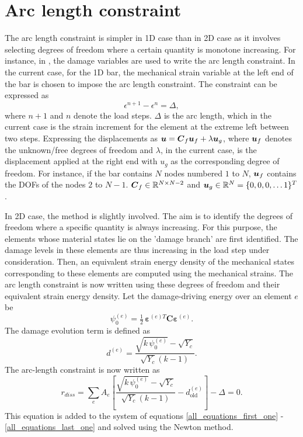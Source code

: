 \documentclass[10pt]{cas-sc}
\begin{document}
\section{Arc length constraint\label{appen_arc_length}}
The arc length constraint is simpler in 1D case than in 2D case as it involves selecting degrees of freedom where a certain quantity is monotone increasing. For instance, in \cite{Bharali2022,Singh2016}, the damage variables are used to write the arc length constraint. In the current case, for the 1D bar, the mechanical strain variable at the left end of the bar is chosen to impose the arc length constraint. The constraint can be expressed as
\begin{equation}
	\epsilon^{n+1} - \epsilon^{n} = \Delta, \label{onedarclength}
\end{equation}
where $n+1$ and $n$ denote the load steps. $\Delta$ is the arc length, which in the current case is the strain increment for the element at the extreme left between two steps. Expressing the displacements as $\mbox{\boldmath $u$} = \mbox{\boldmath $C$}_f \mbox{\boldmath $u$}_f + \lambda \mbox{\boldmath $u$}_g$, where $\mbox{\boldmath $u$}_f$ denotes the unknown/free degrees of freedom and $\lambda$, in the current case, is the displacement applied at the right end with $u_g$ as the corresponding degree of freedom. For instance, if the bar contains $N$ nodes numbered $1$ to $N$, $\mbox{\boldmath $u$}_f$ contains the DOFs of the nodes $2$ to $N-1$. $\mbox{\boldmath $C$}_f \in \mathbb{R}^{N \times N-2}$ and $\mbox{\boldmath $u$}_g \in \mathbb{R}^N = \{0,0,0,\dots 1\}^T$.

In 2D case, the method is slightly involved. The aim is to identify the degrees of freedom where a specific quantity is always increasing. For this purpose, the elements whose material states lie on the 'damage branch' are first identified. The damage levels in these elements are thus increasing in the load step under consideration. Then, an equivalent strain energy density of the mechanical states corresponding to these elements are computed using the mechanical strains. The arc length constraint is now written using these degrees of freedom and their equivalent strain energy density. 
Let the damage-driving energy over an element $e$ be
\begin{equation}
	\psi_0^{(e)} = \tfrac{1}{2}\,\boldsymbol{\varepsilon}^{(e)T}\mathbf{C}\boldsymbol{\varepsilon}^{(e)}. \label{undamaged_energy_func}
\end{equation}
The damage evolution term is defined as
\begin{equation}
	d^{(e)} = \frac{\sqrt{k\,\psi_0^{(e)}} - \sqrt{Y_c}}{\sqrt{Y_c}(k-1)}.
\end{equation}
The arc-length constraint is now written as
\begin{equation}
	r_{diss} = \sum_e A_e
	\left[
	\frac{\sqrt{k\,\psi_0^{(e)}} - \sqrt{Y_c}}{\sqrt{Y_c}(k-1)}
	- d^{(e)}_{\text{old}}
	\right] - \Delta = 0.
\end{equation}
This equation is added to the system of equations \ref{all_equations_first_one} - \ref{all_equations_last_one} and solved using the Newton method.
\end{document}
